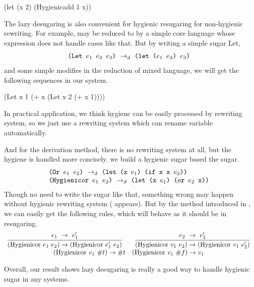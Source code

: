 \begin{Codes}
    (let (x 2) (Hygienicadd 1 x))
\end{Codes}

The lazy desugaring is also convenient for hygienic resugaring for non-hygienic rewriting. For example,  may be reduced to  by a simple core language whose  expression does not handle cases like that. But by writing a simple sugar Let,
\[\texttt{(Let~$e_1$~$e_2$~$e_3$)} ~\rightarrow_d~ \texttt{(let~($e_1$~$e_2$)~$e_3$)}\]
and some simple modifies in the reduction of mixed language, we will get the following sequences in our system.
\begin{Codes}
    (Let x 1 (+ x (Let x 2 (+ x 1))))
\end{Codes}

In practical application, we think hygiene can be easily processed by rewriting system, so we just use a rewriting system which can rename variable automatically. 

And for the derivation method, there is no rewriting system at all, but the hygiene is handled more concisely. we build a hygienic sugar  based the  sugar.
\[
\begin{array}{l}
\texttt{(Or $e_1$ $e_2$)} ~\rightarrow_d~ \texttt{(let (x $e_1$) (if x x $e_2$))}\\
\texttt{(Hygienicor $e_1$ $e_2$)} ~\rightarrow_d~ \texttt{(let (x $e_1$) (or $e_2$ x))}
\end{array}
\]
Though no need to write the sugar like that, something wrong may happen without hygienic rewriting system ( appears). But by the method introduced in , we can easily get the following rules, which will behave as it should be in resugaring.
\[
\begin{array}{c}
\infer {(\mbox{Hygienicor}~e_1~e_2) \rightarrow (\mbox{Hygienicor}~e_1'~e_2)} {e_1~ \rightarrow~e_1'}
\qquad
\infer {(\mbox{Hygienicor}~v_1~e_2) \rightarrow (\mbox{Hygienicor}~v_1~e_2')} {e_2~ \rightarrow~e_2'}
\\
(\mbox{Hygienicor}~v_1~\#t) \rightarrow \#t
\quad
(\mbox{Hygienicor}~v_1~\#f) \rightarrow v_1\\
\end{array}
\]

Overall, our result shows lazy desugaring is really a good way to handle hygienic sugar in any systems.

